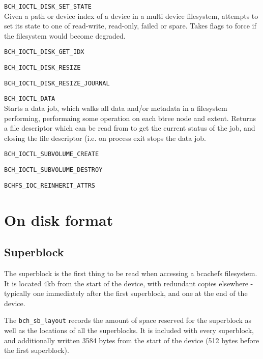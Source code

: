 \documentclass{article}
\begin{document}
\begin{description}
	\item \texttt{BCH\_IOCTL\_DISK\_SET\_STATE} \\
		Given a path or device index of a device in a multi device
		filesystem, attempts to set its state to one of read-write,
		read-only, failed or spare. Takes flags to force if the
		filesystem would become degraded.

	\item \texttt{BCH\_IOCTL\_DISK\_GET\_IDX} \\
	\item \texttt{BCH\_IOCTL\_DISK\_RESIZE} \\
	\item \texttt{BCH\_IOCTL\_DISK\_RESIZE\_JOURNAL} \\
	\item \texttt{BCH\_IOCTL\_DATA} \\
		Starts a data job, which walks all data and/or metadata in a
		filesystem performing, performaing some operation on each btree
		node and extent. Returns a file descriptor which can be read
		from to get the current status of the job, and closing the file
		descriptor (i.e. on process exit stops the data job.

	\item \texttt{BCH\_IOCTL\_SUBVOLUME\_CREATE} \\
	\item \texttt{BCH\_IOCTL\_SUBVOLUME\_DESTROY} \\
	\item \texttt{BCHFS\_IOC\_REINHERIT\_ATTRS} \\
\end{description}

\section{On disk format}

\subsection{Superblock}

The superblock is the first thing to be read when accessing a bcachefs
filesystem. It is located 4kb from the start of the device, with redundant
copies elsewhere - typically one immediately after the first superblock, and one
at the end of the device.

The \texttt{bch\_sb\_layout} records the amount of space reserved for the
superblock as well as the locations of all the superblocks. It is included with
every superblock, and additionally written 3584 bytes from the start of the
device (512 bytes before the first superblock).
\end{document}
